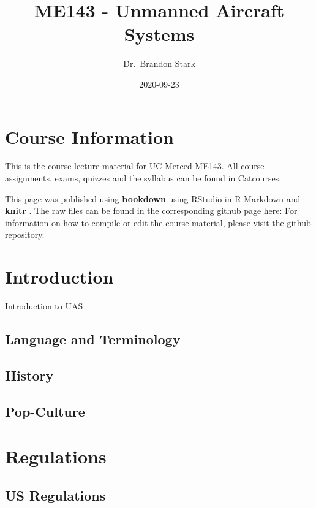 \documentclass[
]{book}
\title{ME143 - Unmanned Aircraft Systems}
\author{Dr.~Brandon Stark}
\date{2020-09-23}
\begin{document}
\maketitle

{
\setcounter{tocdepth}{1}
\tableofcontents
}
\hypertarget{course-information}{%
\chapter{Course Information}\label{course-information}}

This is the course lecture material for UC Merced ME143. All course assignments, exams, quizzes and the syllabus can be found in Catcourses.

This page was published using \textbf{bookdown}\citep{R-bookdown} using RStudio in R Markdown and \textbf{knitr} \citep{xie2015}. The raw files can be found in the corresponding github page here:
For information on how to compile or edit the course material, please visit the github repository.

\hypertarget{ch-intro}{%
\chapter{Introduction}\label{ch-intro}}

Introduction to UAS

\hypertarget{language-and-terminology}{%
\section{Language and Terminology}\label{language-and-terminology}}

\hypertarget{history}{%
\section{History}\label{history}}

\hypertarget{pop-culture}{%
\section{Pop-Culture}\label{pop-culture}}

\hypertarget{regulations}{%
\chapter{Regulations}\label{regulations}}

\hypertarget{us-regulations}{%
\section{US Regulations}\label{us-regulations}}
\end{document}

